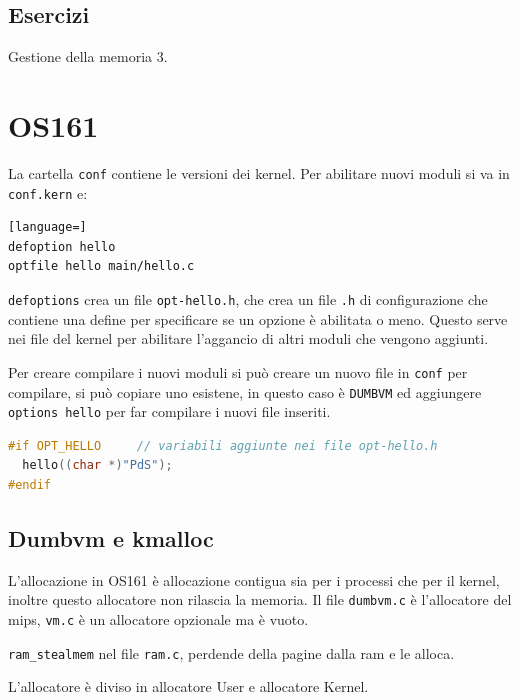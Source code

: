 \documentclass[12pt]{article}
\begin{document}
\subsection{Esercizi}
Gestione della memoria 3.







\newpage
\section{OS161}
La cartella \texttt{conf} contiene le versioni dei kernel. Per abilitare nuovi moduli si va in \texttt{conf.kern} e:
\begin{lstlisting}[language=]
defoption hello
optfile hello main/hello.c
\end{lstlisting}
\texttt{defoptions} crea un file \texttt{opt-hello.h}, che crea un file \texttt{.h} di configurazione che contiene una define per specificare se un opzione \`e abilitata o meno. Questo serve nei file del kernel per abilitare l'aggancio di altri moduli che vengono aggiunti.

Per creare compilare i nuovi moduli si pu\`o creare un nuovo file in \texttt{conf} per compilare, si pu\`o copiare uno esistene, in questo caso \`e \texttt{DUMBVM} ed aggiungere \texttt{options hello} per far compilare i nuovi file inseriti.
\begin{lstlisting}[language=c]
#if OPT_HELLO     // variabili aggiunte nei file opt-hello.h
  hello((char *)"PdS");
#endif
\end{lstlisting}

\subsection{Dumbvm e kmalloc}
L'allocazione in OS161 \`e allocazione contigua sia per i processi che per il kernel, inoltre questo allocatore non rilascia la memoria. Il file \texttt{dumbvm.c} \`e l'allocatore del mips, \texttt{vm.c} \`e un allocatore opzionale ma \`e vuoto.

\texttt{ram\_stealmem} nel file \texttt{ram.c}, perdende della pagine dalla ram e le alloca.

L'allocatore \`e diviso in allocatore User e allocatore Kernel.
\end{document}
